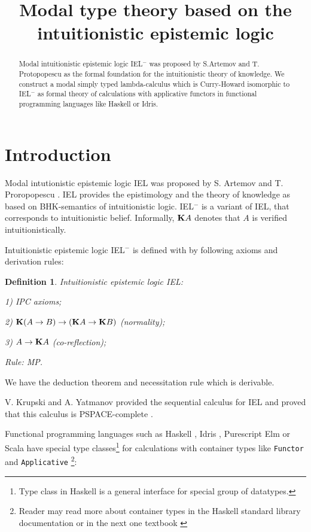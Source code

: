 \documentclass[a4paper]{article}
\date{}
\title{Modal type theory based on the intuitionistic epistemic logic}
\newtheorem{defin}{Definition}
\begin{document}
\maketitle

\begin{abstract}
Modal intuitionistic epistemic logic IEL$^{-}$ was proposed by S.Artemov and T. Protopopescu as the formal
foundation for the intuitionistic theory of knowledge. We construct a modal simply typed lambda-calculus
which is Curry-Howard isomorphic to IEL$^{-}$ as formal theory of calculations with applicative functors in
functional programming languages like Haskell or Idris.
\end{abstract}



  \section{Introduction}

  Modal intutionistic epistemic logic IEL was proposed by S. Artemov and T. Proropopescu \cite{Artemov}. IEL
  provides the epistimology and the theory of knowledge as based on BHK-semantics of intuitionistic logic.
  IEL$^{-}$  is a variant of IEL, that corresponds to intuitionistic belief.
  Informally, ${\bf K}A$ denotes that $A$ is verified intuitionistically.

  Intuitionistic epistemic logic IEL$^{-}$ is defined with by following axioms and derivation rules:

  \begin{defin} Intuitionistic epistemic logic IEL:

    1) IPC axioms;

    2) ${\bf K}(A \to B) \to ({\bf K}A \to {\bf K}B)$ (normality);

    3) $A \to {\bf K}A$ (co-reflection);

    Rule: MP.

  \end{defin}

  We have the deduction theorem and necessitation rule which is derivable.

  V. Krupski and  A. Yatmanov provided the sequential calculus for IEL and proved that this calculus is
  PSPACE-complete \cite{Krupski}.

  Functional programming languages such as Haskell \cite{Haskell}, Idris \cite{Idris}, Purescript \cite{Purs}
  Elm \cite{Elm} or Scala \cite{Scala} have special type classes\footnote{Type class in Haskell is a general interface for
  special group of datatypes.} for calculations with container types like \verb"Functor" and
  \verb"Applicative" \footnote{Reader may read more about container types in the Haskell standard library documentation\cite{Base} or in the next one textbook
  \cite{Miran}}:
\end{document}
